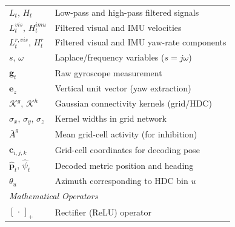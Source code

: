 {\begin{longtable}{p{}p{}}
            $L_t,\,H_t$                                                 & Low-pass and high-pass filtered signals                              \\
            $L^{vis}_t,\,H^{imu}_t$                                     & Filtered visual and IMU velocities                                   \\
            $L^{r,vis}_t,\,H^{r}_t$                                     & Filtered visual and IMU yaw-rate components                          \\
            $s,\,\omega$                                                & Laplace/frequency variables ($s=j\omega$)                            \\
            $\mathbf{g}_t$                                              & Raw gyroscope measurement                                            \\
            $\mathbf{e}_z$                                              & Vertical unit vector (yaw extraction)                                \\
            $\mathcal{K}^g,\,\mathcal{K}^h$                             & Gaussian connectivity kernels (grid/HDC)                             \\
            $\sigma_x,\,\sigma_y,\,\sigma_z$                            & Kernel widths in grid network                                        \\
            $\bar A^{g}$                                                & Mean grid-cell activity (for inhibition)                             \\
            $\mathbf{c}_{i,j,k}$                                        & Grid-cell coordinates for decoding pose                              \\
            $\hat{\mathbf{p}}_t,\,\hat{\psi}_t$                         & Decoded metric position and heading                                  \\
            $\theta_u$                                                  & Azimuth corresponding to HDC bin $u$                                 \\
            \midrule
            \multicolumn{2}{l}{\textit{Mathematical Operators}}                                                                                \\
            $[\,\cdot\,]_+$                                             & Rectifier (ReLU) operator                                            \\

\end{longtable}}
